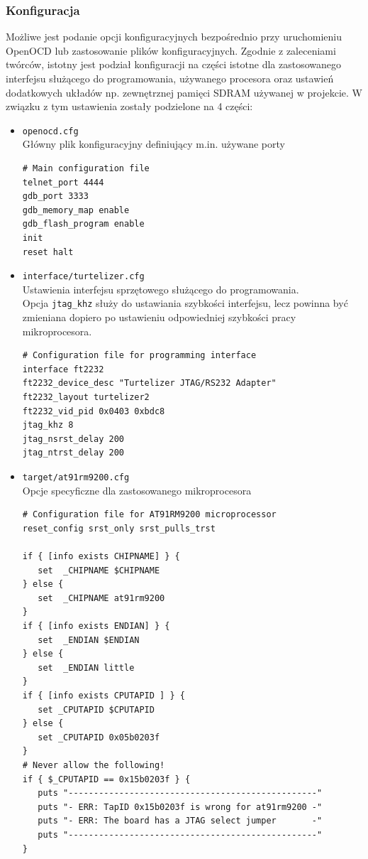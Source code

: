 \documentclass[a4paper,12pt]{book}
\begin{document}
				\subsubsection{Konfiguracja}
					Możliwe jest podanie opcji konfiguracyjnych bezpośrednio przy uruchomieniu OpenOCD lub zastosowanie plików konfiguracyjnych. Zgodnie z zaleceniami twórców, istotny jest podział konfiguracji na części istotne dla zastosowanego interfejsu służącego do programowania, używanego procesora oraz ustawień dodatkowych układów np. zewnętrznej pamięci SDRAM używanej w projekcie. W związku z tym ustawienia zostały podzielone na 4 części:
					\begin{itemize}
						\item{\texttt{openocd.cfg}}\\
							Główny plik konfiguracyjny definiujący m.in. używane porty
							\begin{lstlisting}[basicstyle={\footnotesize\ttfamily}]
# Main configuration file
telnet_port 4444
gdb_port 3333
gdb_memory_map enable
gdb_flash_program enable
init
reset halt
							\end{lstlisting}
						\item{\texttt{interface/turtelizer.cfg}}\\
							Ustawienia interfejsu sprzętowego służącego do programowania.\\
							Opcja \texttt{jtag\_khz} służy do ustawiania szybkości interfejsu, lecz powinna być zmieniana dopiero po ustawieniu odpowiedniej szybkości pracy mikroprocesora.
							\begin{lstlisting}[basicstyle={\footnotesize\ttfamily}]
# Configuration file for programming interface
interface ft2232
ft2232_device_desc "Turtelizer JTAG/RS232 Adapter"
ft2232_layout turtelizer2
ft2232_vid_pid 0x0403 0xbdc8			
jtag_khz 8
jtag_nsrst_delay 200
jtag_ntrst_delay 200
							\end{lstlisting}
						\item{\texttt{target/at91rm9200.cfg}}\\
							Opcje specyficzne dla zastosowanego mikroprocesora
							\begin{lstlisting}[basicstyle={\footnotesize\ttfamily}]
# Configuration file for AT91RM9200 microprocessor
reset_config srst_only srst_pulls_trst

if { [info exists CHIPNAME] } {
   set  _CHIPNAME $CHIPNAME
} else {
   set  _CHIPNAME at91rm9200
}
if { [info exists ENDIAN] } {
   set  _ENDIAN $ENDIAN
} else {
   set  _ENDIAN little
}
if { [info exists CPUTAPID ] } {
   set _CPUTAPID $CPUTAPID
} else {
   set _CPUTAPID 0x05b0203f
}
# Never allow the following!
if { $_CPUTAPID == 0x15b0203f } {
   puts "-------------------------------------------------"
   puts "- ERR: TapID 0x15b0203f is wrong for at91rm9200 -"
   puts "- ERR: The board has a JTAG select jumper       -"
   puts "-------------------------------------------------"
}


\end{lstlisting}
\end{itemize}
\end{document}
